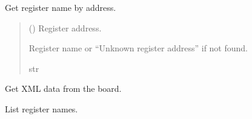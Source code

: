 \documentclass[letterpaper,10pt,english]{sphinxmanual}
\begin{document}
\begin{fulllineitems}
\begin{fulllineitems}
\begin{quote}
\begin{description}
\end{description}\end{quote}

\end{fulllineitems}


\begin{fulllineitems}
\label{\detokenize{apidocs:management.MANAGEMENT.get_register_name_by_address}}
\pysigstartsignatures
{}
\pysigstopsignatures
\sphinxAtStartPar
Get register name by address.
\begin{quote}\begin{description}
\sphinxAtStartPar
{} () \textendash{} Register address.

\sphinxAtStartPar
Register name or “Unknown register address” if not found.

\sphinxAtStartPar
str

\end{description}\end{quote}

\end{fulllineitems}


\begin{fulllineitems}
\label{\detokenize{apidocs:management.MANAGEMENT.get_xml_from_board}}
\pysigstartsignatures
{}
\pysigstopsignatures
\sphinxAtStartPar
Get XML data from the board.

\end{fulllineitems}


\begin{fulllineitems}
\label{\detokenize{apidocs:management.MANAGEMENT.list_register_names}}
\pysigstartsignatures
{}
\pysigstopsignatures
\sphinxAtStartPar
List register names.
\begin{quote}\begin{description}
\sphinxAtStartPar
{} \textendash{} 


\end{description}
\end{quote}
\end{fulllineitems}
\end{fulllineitems}
\end{document}
